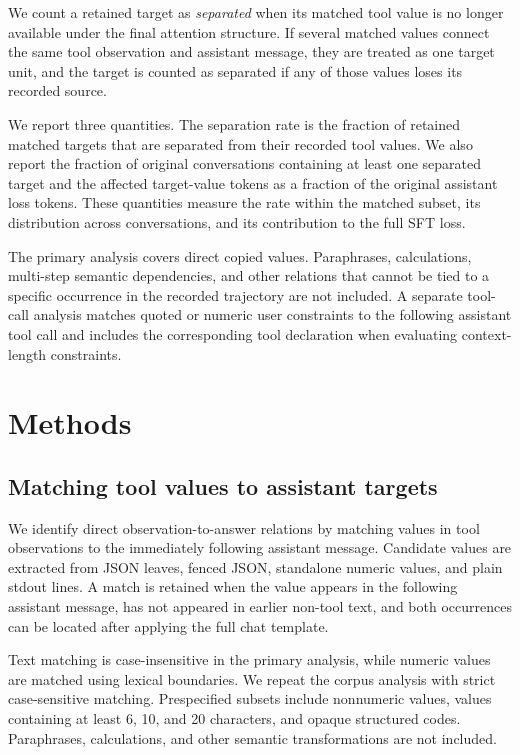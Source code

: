 \documentclass[pdflatex,sn-basic,Numbered]{sn-jnl}
\begin{document}
We count a retained target as \emph{separated} when its matched tool value is no
longer available under the final attention structure. If several matched values connect
the same tool observation and assistant message, they are treated as one target unit,
and the target is counted as separated if any of those values loses its recorded source.

We report three quantities. The separation rate is the fraction of retained matched
targets that are separated from their recorded tool values. We also report the fraction
of original conversations containing at least one separated target and the affected
target-value tokens as a fraction of the original assistant loss tokens. These quantities
measure the rate within the matched subset, its distribution across conversations, and
its contribution to the full SFT loss.

The primary analysis covers direct copied values. Paraphrases, calculations, multi-step semantic
dependencies, and other relations that cannot be tied to a specific occurrence in the recorded
trajectory are not included. A separate tool-call analysis matches quoted or numeric user
constraints to the following assistant tool call and includes the corresponding tool declaration
when evaluating context-length constraints.

\section{Methods}

\subsection{Matching tool values to assistant targets}
\label{sec:relation_extraction}

We identify direct observation-to-answer relations by matching values in tool observations to the immediately following assistant message. Candidate values are extracted from JSON leaves, fenced JSON, standalone numeric values, and plain stdout lines. A match is retained when the value appears in the following assistant message, has not appeared in earlier non-tool text, and both occurrences can be located after applying the full chat template.

Text matching is case-insensitive in the primary analysis, while numeric values are matched using lexical boundaries. We repeat the corpus analysis with strict case-sensitive matching. Prespecified subsets include nonnumeric values, values containing at least 6, 10, and 20 characters, and opaque structured codes. Paraphrases, calculations, and other semantic transformations are not included.
\end{document}
